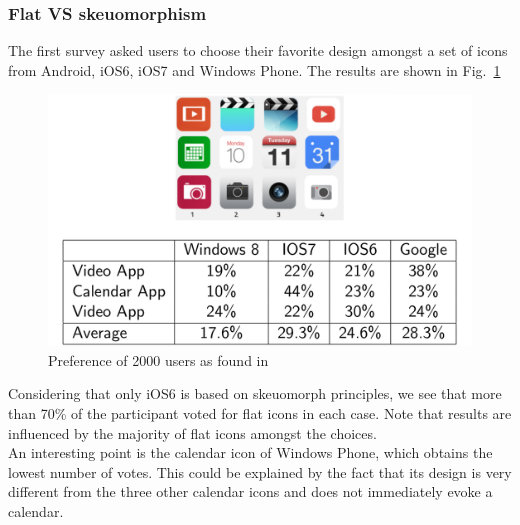 \documentclass[a4paper,11pt] {article}
\theoremstyle{definition}
\begin{document}
    \subsubsection{Flat VS skeuomorphism}

    The first survey \cite{flatVSskeuomorphisme} asked users to choose their favorite design amongst a set of icons from Android, iOS6, iOS7 and Windows Phone. The results are shown in Fig.~\ref{fig:flat-vs-skeu-result}\\

    \begin{figure}[h]
    \centering
    \includegraphics[scale=0.3]{fig-report/flatVSskeuomorphism.png}
    \caption{Preference of 2000 users as found in \cite{flatVSskeuomorphisme}}
    \label{fig:flat-vs-skeu-result}
    \end{figure}

    Considering that only iOS6 is based on skeuomorph principles, we see that more than 70\% of the participant voted for flat icons in each case. Note that results are influenced by the majority of flat icons amongst the choices.\\

    An interesting point is the calendar icon of Windows Phone, which obtains the lowest number of votes. This could be explained by the fact that its design is very different from the three other calendar icons and does not immediately evoke a calendar.\\

\end{document}
